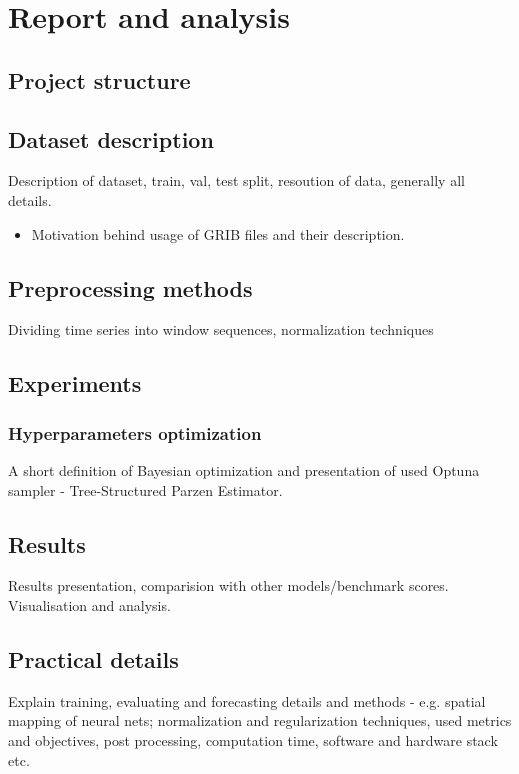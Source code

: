 \chapter{Report and analysis}

\section{Project structure}


\section{Dataset description}\label{chap:dataset}
Description of dataset, train, val, test split, resoution of data, generally all details.
\begin{itemize}
    \item Motivation behind usage of GRIB files and their description.
\end{itemize}

\section{Preprocessing methods}
Dividing time series into window sequences, normalization techniques

\section{Experiments}

\subsection{Hyperparameters optimization}
A short definition of Bayesian optimization and presentation of used Optuna sampler - Tree-Structured Parzen Estimator.~\cite{watanabe2023treestructured} 

\section{Results}
Results presentation, comparision with other models/benchmark scores. Visualisation and analysis.

\section{Practical details}
Explain training, evaluating and forecasting details and methods - e.g. spatial mapping of neural nets;
normalization and regularization techniques, used metrics and objectives, post processing, computation time, software and hardware stack etc. 

